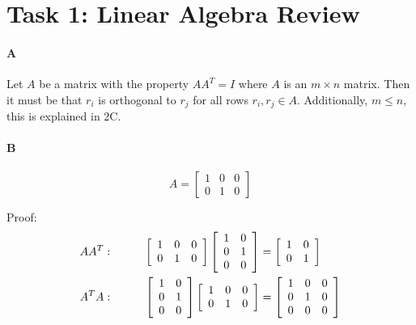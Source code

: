 \documentclass[12pt]{article}
\begin{document}
\maketitle

\section{Task 1: Linear Algebra Review}

\paragraph{A}
Let $A$ be a matrix with the property $AA^T = I$ where $A$ is an $m\times n$ matrix.  Then it must be that $r_i$ is orthogonal to $r_j$ for all rows $r_i, r_j \in A$.  Additionally, $m \leq n$, this is explained in 2C.

\paragraph{B}
\begin{equation*}
A = \left[ \begin{array}{ccc} 1 & 0 & 0 \\ 0 & 1 & 0 \end{array} \right]
\end{equation*}

Proof: \\
\begin{align*}
AA^T:\hspace{10 mm}
\left[ \begin{array}{ccc} 1 & 0 & 0 \\ 0 & 1 & 0 \end{array} \right]
\left[ \begin{array}{cc} 1 & 0  \\ 0 & 1 \\ 0 & 0 \end{array} \right]
&=\left[ \begin{array}{cc} 1 & 0  \\ 0 & 1 \end{array} \right] \\
A^TA:\hspace{10 mm}
\left[ \begin{array}{cc} 1 & 0  \\ 0 & 1 \\ 0 & 0 \end{array} \right]
\left[ \begin{array}{ccc} 1 & 0 & 0 \\ 0 & 1 & 0 \end{array} \right]
&=\left[ \begin{array}{ccc} 1 & 0 & 0  \\ 0 & 1 & 0 \\ 0 & 0 & 0 \end{array} \right]
\end{align*}
\end{document}
